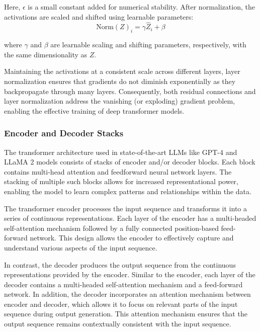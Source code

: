 \begin{itemize}
Here, \( \epsilon \) is a small constant added for numerical stability. After normalization, the activations are scaled and shifted using learnable parameters:
\begin{equation}
\text{Norm}(Z)_i = \gamma \hat{Z}_i + \beta
\end{equation}

where \( \gamma \) and \( \beta \) are learnable scaling and shifting parameters, respectively, with the same dimensionality as \( Z \).

Maintaining the activations at a consistent scale across different layers, layer normalization ensures that gradients do not diminish exponentially as they backpropagate through many layers. Consequently, both residual connections and layer normalization address the vanishing (or exploding) gradient problem, enabling the effective training of deep transformer models.

\subsubsection{Encoder and Decoder Stacks}

The transformer architecture used in state-of-the-art LLMs like GPT-4 \cite{achiam2023gpt} and LLaMA 2 \cite{touvron2023llama} models consists of stacks of encoder and/or decoder blocks. Each block contains multi-head attention and feedforward neural network layers. The stacking of multiple such blocks allows for increased representational power, enabling the model to learn complex patterns and relationships within the data.

The transformer encoder processes the input sequence and transforms it into a series of continuous representations. Each layer of the encoder has a multi-headed self-attention mechanism followed by a fully connected position-based feed-forward network. This design allows the encoder to effectively capture and understand various aspects of the input sequence.

In contrast, the decoder produces the output sequence from the continuous representations provided by the encoder. Similar to the encoder, each layer of the decoder contains a multi-headed self-attention mechanism and a feed-forward network. In addition, the decoder incorporates an attention mechanism between encoder and decoder, which allows it to focus on relevant parts of the input sequence during output generation. This attention mechanism ensures that the output sequence remains contextually consistent with the input sequence.


\end{itemize}
